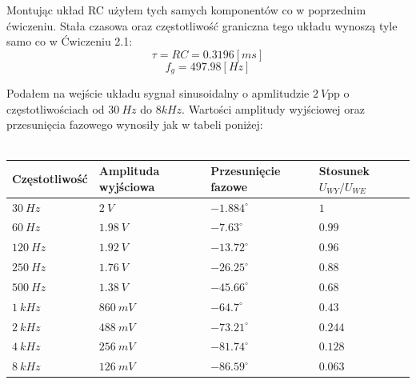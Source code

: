 \documentclass[14pt, table]{extarticle}
\begin{document}
\begin{figure}[H]
    \centering
    \qquad
\end{figure}

Montując układ RC użyłem tych samych komponentów co w poprzednim ćwiczeniu. Stała czasowa oraz częstotliwość graniczna tego układu wynoszą tyle samo co w Ćwiczeniu 2.1:
$$ \tau = RC = 0.3196  \left[ ms \right] $$
$$ f_g = 497.98  \left[ Hz \right] $$

Podałem na wejście układu sygnał sinusoidalny o apmlitudzie $2 \ V$pp o częstotliwościach od $30 \ Hz$ do $8 kHz$. Wartości amplitudy wyjściowej oraz przesunięcia fazowego wynosiły jak w tabeli poniżej: \\
\\

\begin{tabular}{ | m{4cm} | m{4cm}| m{4cm} | m{3.5cm} | } 
  \hline
  \textbf{Częstotliwość} & \textbf{Amplituda wyjściowa} & \textbf{Przesunięcie fazowe} & \textbf{Stosunek } $U_{WY} / U_{WE}$ \\ 
  \hline
  $30 \ Hz$ & $2 \ V$ & $-1.884^{\circ}$ & $1$ \\
  \hline
  $60 \ Hz$ & $1.98 \ V$ & $-7.63^{\circ}$ & $0.99$ \\
  \hline
  $120 \ Hz$ & $1.92 \ V$ & $-13.72^{\circ}$ & $0.96$ \\
  \hline
  $250 \ Hz$ & $1.76 \ V$ & $-26.25^{\circ}$ & $0.88$ \\
  \hline
  $500 \ Hz$ & $1.38 \ V$ & $-45.66^{\circ}$ & $0.68$ \\
  \hline
  $1 \ kHz$ & $860 \ mV$ & $-64.7^{\circ}$ & $0.43$ \\
  \hline
  $2 \ kHz$ & $488 \ mV$ & $-73.21^{\circ}$ & $0.244$ \\
  \hline
  $4 \ kHz$ & $256 \ mV$ & $-81.74^{\circ}$ & $0.128$ \\
  \hline
  $8 \ kHz$ & $126 \ mV$ & $-86.59^{\circ}$ &  $0.063$ \\
  \hline
\end{tabular}
\end{document}
